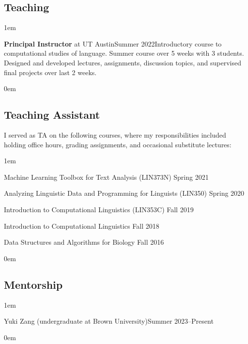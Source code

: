\subsection{Teaching}
\vspace{-0.5\baselineskip}
\leftskip1em\relax

  {\textbf{Principal Instructor} at UT Austin}{Summer 2022}{}{Introductory course to computational studies of language. Summer course over 5 weeks with 3 students. Designed and developed lectures, assignments, discussion topics, and supervised final projects over last 2 weeks.}

\leftskip0em\relax
  
\subsection{Teaching Assistant}

\quad I served as TA on the following courses, where my responsibilities included holding office hours, grading assignments, and occasional substitute lectures:

\leftskip1em\relax

\vspace{0.5\baselineskip}

\textbullet\enspace Machine Learning Toolbox for Text Analysis ({\rmsc LIN373N}) \hfill Spring 2021

\textbullet\enspace Analyzing Linguistic Data and Programming for Linguists ({\rmsc LIN350}) \hfill Spring 2020

\textbullet\enspace Introduction to Computational Linguistics ({\rmsc LIN353C}) \hfill Fall 2019

\textbullet\enspace Introduction to Computational Linguistics \hfill Fall 2018

\textbullet\enspace Data Structures and Algorithms for Biology \hfill Fall 2016

\leftskip0em\relax

\subsection{Mentorship}
\vspace{-0.5\baselineskip}
\leftskip1em\relax

  {Yuki Zang (undergraduate at Brown University)}{Summer 2023--Present}{}{}

\leftskip0em\relax
